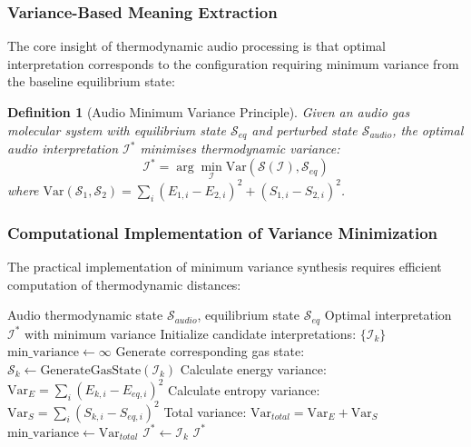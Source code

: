 \documentclass[12pt,a4paper]{article}
\newtheorem{definition}{Definition}
\begin{document}
\subsubsection{Variance-Based Meaning Extraction}

The core insight of thermodynamic audio processing is that optimal interpretation corresponds to the configuration requiring minimum variance from the baseline equilibrium state:

\begin{definition}[Audio Minimum Variance Principle]
Given an audio gas molecular system with equilibrium state $\mathcal{S}_{eq}$ and perturbed state $\mathcal{S}_{audio}$, the optimal audio interpretation $\mathcal{I}^*$ minimises thermodynamic variance:
\begin{equation}
\mathcal{I}^* = \arg\min_{\mathcal{I}} \text{Var}(\mathcal{S}(\mathcal{I}), \mathcal{S}_{eq})
\end{equation}
where $\text{Var}(\mathcal{S}_1, \mathcal{S}_2) = \sum_{i} (E_{1,i} - E_{2,i})^2 + (S_{1,i} - S_{2,i})^2$.
\end{definition}

\subsubsection{Computational Implementation of Variance Minimization}

The practical implementation of minimum variance synthesis requires efficient computation of thermodynamic distances:

\begin{algorithm}[H]
\caption{Audio Minimum Variance Synthesis}
\begin{algorithmic}[1]
\REQUIRE Audio thermodynamic state $\mathcal{S}_{audio}$, equilibrium state $\mathcal{S}_{eq}$
\ENSURE Optimal interpretation $\mathcal{I}^*$ with minimum variance
\STATE Initialize candidate interpretations: $\{\mathcal{I}_k\}$
\STATE $\text{min\_variance} \leftarrow \infty$
    \STATE Generate corresponding gas state: $\mathcal{S}_k \leftarrow \text{GenerateGasState}(\mathcal{I}_k)$
    \STATE Calculate energy variance: $\text{Var}_E = \sum_i (E_{k,i} - E_{eq,i})^2$
    \STATE Calculate entropy variance: $\text{Var}_S = \sum_i (S_{k,i} - S_{eq,i})^2$
    \STATE Total variance: $\text{Var}_{total} = \text{Var}_E + \text{Var}_S$
        \STATE $\text{min\_variance} \leftarrow \text{Var}_{total}$
        \STATE $\mathcal{I}^* \leftarrow \mathcal{I}_k$
    \ENDIF
\ENDFOR
\RETURN $\mathcal{I}^*$
\end{algorithmic}
\end{algorithm}
\end{document}
